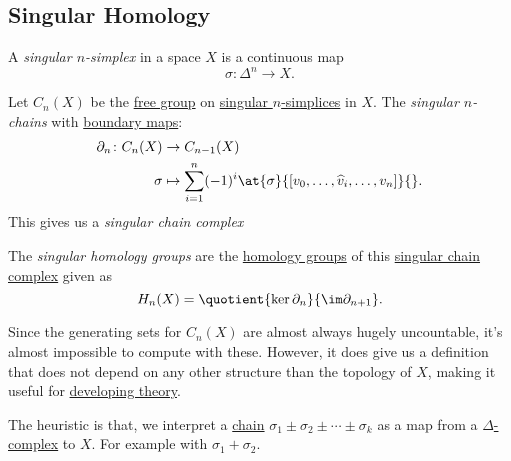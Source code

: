 \subsection{Singular Homology}
\begin{definition}\label{def:singular-simplex}
	A \emph{singular \(n\)-simplex} in a space \(X\) is a continuous map
	\[
		\sigma \colon \Delta^n \to X.
	\]
\end{definition}

\begin{definition}\label{def:singular-chain}
	Let \(C_n(X)\) be the \hyperref[def:free-group]{free group} on \hyperref[def:singular-simplex]{singular \(n\)-simplices} in \(X\).
	The \emph{singular \(n\)-chains} with \hyperref[def:boundary-homomorphism]{boundary maps}:
	\[
		\begin{split}
			\partial_n \colon C_n(X) & \to C_{n - 1}(X)                                                                       \\
			\sigma              & \mapsto \sum_{i = 1}^n (-1)^i \at{\sigma}{[v_0, \ldots, \widehat{v}_i, \ldots, v_n]}{}.
		\end{split}
	\]
	This gives us a \emph{singular chain complex}
\end{definition}

\begin{definition}\label{def:singular-homology-group}
	The \emph{singular homology groups} are the \hyperref[def:homology-group]{homology groups} of this \hyperref[def:singular-chain]{singular chain complex} given as
	\[
		H_n(X) = \quotient{\ker \partial_n}{\im \partial_{n + 1}}.
	\]
\end{definition}

Since the generating sets for \(C_n(X)\) are almost always hugely uncountable, it's almost impossible to compute with these. However, it does give us a
definition that does not depend on any other structure than the topology of $X$, making it useful for \underline{developing theory}.

\begin{note}
	The heuristic is that, we interpret a \hyperref[def:chain-complex]{chain} $\sigma_1 \pm \sigma_2 \pm \cdots \pm \sigma_k$ as a map from a \hyperref[def:delta-complex]{\(\Delta\)-complex} to \(X\).
	For example with \(\sigma_1 + \sigma_2\).
\end{note}

\begin{figure}[H]
	\centering
	\label{fig:note:chain-as-a-map}
\end{figure}

